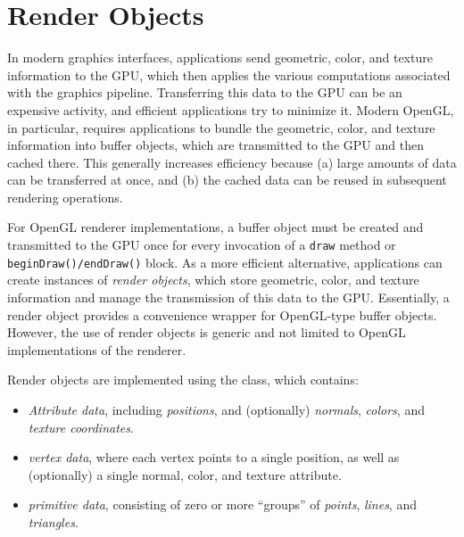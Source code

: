 \section{Render Objects}
\label{renderObjects:sec}

In modern graphics interfaces, applications send geometric, color,
and texture information to the GPU, which then applies the various
computations associated with the graphics pipeline. Transferring this
data to the GPU can be an expensive activity, and efficient applications
try to minimize it. Modern OpenGL, in particular, requires
applications to bundle the geometric, color, and texture information
into buffer objects, which are transmitted to the GPU and then cached
there.  This generally increases efficiency because (a) large amounts
of data can be transferred at once, and (b) the cached data can be
reused in subsequent rendering operations.

For OpenGL renderer implementations, a buffer object must be created
and transmitted to the GPU once for every invocation of a {\tt draw}
method or {\tt beginDraw()/endDraw()} block. As a more efficient
alternative, applications can create instances of {\it render
objects}, which store geometric, color, and texture information and
manage the transmission of this data to the GPU. Essentially, a render
object provides a convenience wrapper for OpenGL-type buffer objects.
However, the use of render objects is generic and not limited to
OpenGL implementations of the renderer.

Render objects are implemented using the
 class, which
contains:

\begin{itemize}

\item {\it Attribute data}, including {\it positions}, and
(optionally) {\it normals}, {\it colors}, and {\it texture
coordinates}.

\item {\it vertex data}, where each vertex points to a single
position, as well as (optionally) a single normal, color, and texture
attribute.

\item {\it primitive data}, consisting of zero or more ``groups'' of
{\it points}, {\it lines}, and {\it triangles}.

\end{itemize}

